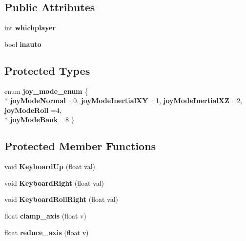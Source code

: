 \subsection*{Public Attributes}
\begin{DoxyCompactItemize}
\item 
int {\bfseries whichplayer}\hypertarget{classFlyByKeyboard_af8098682c8a2eb555e288ee4e59177a9}{}\label{classFlyByKeyboard_af8098682c8a2eb555e288ee4e59177a9}

\item 
bool {\bfseries inauto}\hypertarget{classFlyByKeyboard_add9375e95e9c5f1e47421ba3298a6498}{}\label{classFlyByKeyboard_add9375e95e9c5f1e47421ba3298a6498}

\end{DoxyCompactItemize}
\subsection*{Protected Types}
\begin{DoxyCompactItemize}
\item 
enum {\bfseries joy\+\_\+mode\+\_\+enum} \{ \\*
{\bfseries joy\+Mode\+Normal} =0, 
{\bfseries joy\+Mode\+Inertial\+XY} =1, 
{\bfseries joy\+Mode\+Inertial\+XZ} =2, 
{\bfseries joy\+Mode\+Roll} =4, 
\\*
{\bfseries joy\+Mode\+Bank} =8
 \}\hypertarget{classFlyByKeyboard_ad19eac33bf18494bcd57f04f618fae56}{}\label{classFlyByKeyboard_ad19eac33bf18494bcd57f04f618fae56}

\end{DoxyCompactItemize}
\subsection*{Protected Member Functions}
\begin{DoxyCompactItemize}
\item 
void {\bfseries Keyboard\+Up} (float val)\hypertarget{classFlyByKeyboard_a39fccf226d4440c7f48c831fa7298d56}{}\label{classFlyByKeyboard_a39fccf226d4440c7f48c831fa7298d56}

\item 
void {\bfseries Keyboard\+Right} (float val)\hypertarget{classFlyByKeyboard_a4662c70c4688116d7e74562409bf6108}{}\label{classFlyByKeyboard_a4662c70c4688116d7e74562409bf6108}

\item 
void {\bfseries Keyboard\+Roll\+Right} (float val)\hypertarget{classFlyByKeyboard_ac191fd4a4ca9291132adc25810be814d}{}\label{classFlyByKeyboard_ac191fd4a4ca9291132adc25810be814d}

\item 
float {\bfseries clamp\+\_\+axis} (float v)\hypertarget{classFlyByKeyboard_a7dadc19defc9c04efef600f9031f4178}{}\label{classFlyByKeyboard_a7dadc19defc9c04efef600f9031f4178}

\item 
float {\bfseries reduce\+\_\+axis} (float v)\hypertarget{classFlyByKeyboard_a09666ec06d66b08d9b27b8d662459404}{}\label{classFlyByKeyboard_a09666ec06d66b08d9b27b8d662459404}

\end{DoxyCompactItemize}

